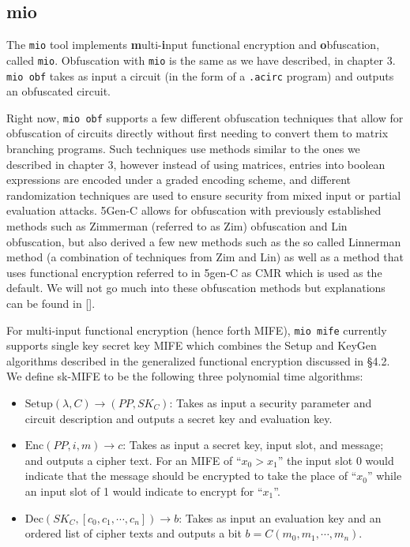 \documentclass[12pt,twoside]{reedthesis}
\newcommand{\enc}[0]{\text{Enc}}
\newcommand{\dec}[0]{\text{Dec}}
\begin{document}
          \subsection{mio}
    \par The \texttt{mio} tool implements \textbf{m}ulti-\textbf{i}nput functional encryption and \textbf{o}bfuscation, called \texttt{mio}. Obfuscation with \texttt{mio} is the same as we have described, in chapter 3. \texttt{mio obf} takes as input a circuit (in the form of a \texttt{.acirc} program) and outputs an obfuscated circuit.
    \par Right now, \texttt{mio obf} supports a few different obfuscation techniques that allow for obfuscation of circuits directly without first needing to convert them to matrix branching programs. Such techniques use methods similar to the ones we described in chapter 3, however instead of using matrices, entries into boolean expressions are encoded under a graded encoding scheme, and different randomization techniques are used to ensure security from mixed input or partial evaluation attacks. 5Gen-C allows for obfuscation with previously established methods such as Zimmerman (referred to as Zim) obfuscation and Lin obfuscation, but also derived a few new methods such as the so called Linnerman method (a combination of techniques from Zim and Lin) as well as a method that uses functional encryption referred to in 5gen-C as CMR which is used as the default. We will not go much into these obfuscation methods but explanations can be found in [\cite{5genc}].
    \par For multi-input functional encryption (hence forth MIFE), \texttt{mio mife} currently supports single key secret key MIFE which combines the Setup and KeyGen algorithms described in the generalized functional encryption discussed in \S 4.2. We define sk-MIFE to be the following three polynomial time algorithms:
    \begin{itemize}
       \item$ \text{Setup}(\lambda,C) \to (PP,SK_C)$:
        Takes as input a security parameter and circuit description and outputs a secret key and evaluation key. 
        \item $\enc(PP,i,m) \to c$:
        Takes as input a secret key, input slot, and message; and outputs a cipher text. For an MIFE of ``$x_0>x_1$'' the input slot 0 would indicate that the message should be encrypted to take the place of ``$x_0$'' while an input slot of 1 would indicate to encrypt for ``$x_1$''.    
        \item $\dec(SK_C,[c_0,c_1,\cdots,c_n]) \to b$:
        Takes as input an evaluation key and an ordered list of cipher texts and outputs a bit $b = C(m_0,m_1,\cdots,m_n)$.
        \end{itemize}
\end{document}
